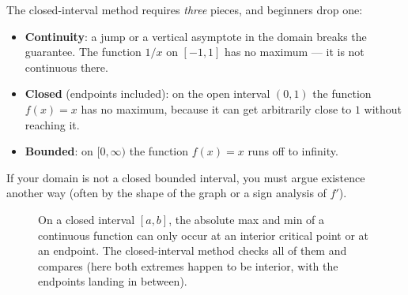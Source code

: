 \begin{trapbox}
The closed-interval method requires \emph{three} pieces, and beginners drop one:
\begin{itemize}
  \item \textbf{Continuity}: a jump or a vertical asymptote in the domain breaks the
    guarantee. The function $1/x$ on $[-1,1]$ has no maximum --- it is not continuous
    there.
  \item \textbf{Closed} (endpoints included): on the open interval $(0,1)$ the
    function $f(x)=x$ has no maximum, because it can get arbitrarily close to $1$
    without reaching it.
  \item \textbf{Bounded}: on $[0,\infty)$ the function $f(x)=x$ runs off to infinity.
\end{itemize}
If your domain is not a closed bounded interval, you must argue existence another way
(often by the shape of the graph or a sign analysis of $f'$).
\end{trapbox}

\begin{figure}[H]
\centering
{}
\caption{On a closed interval $[a,b]$, the absolute max and min of a continuous
function can only occur at an interior critical point or at an endpoint. The
closed-interval method checks all of them and compares (here both extremes happen to
be interior, with the endpoints landing in between).}
\label{ch17:fig-closed-interval}
\end{figure}

